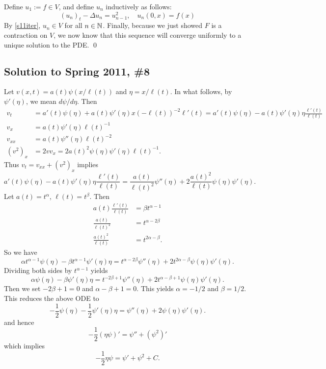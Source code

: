 \vspace{0.2cm}

Define $u_1 := f \in V$, and define $u_n$ inductively as follows:
$$ (u_n)_t - \Delta u_n = u_{n-1}^2, \quad u_n(0,x) = f(x) $$
By \eqref{s11iter}, $u_n \in V$ for all $n \in \mathbb{N}$. Finally, because we just showed $F$ is a contraction on $V$, we now know that this sequence will converge uniformly to a unique solution to the PDE.
\hfill\qed


\subsection*{Solution to Spring 2011, \#8}\label{s118}
Let $v(x, t) = a(t)\psi(x/\ell(t))$ and $\eta = x/\ell(t)$. In what follows, by $\psi'(\eta)$, we mean $d\psi/d\eta$.
Then
\begin{align*}
v_{t} &= a'(t)\psi(\eta) + a(t)\psi'(\eta)x(-\ell(t))^{-2}\ell'(t) = a'(t)\psi(\eta) - a(t)\psi'(\eta)\eta\frac{\ell'(t)}{\ell(t)}\\
v_{x} &= a(t)\psi'(\eta)\ell(t)^{-1}\\
v_{xx} &= a(t)\psi''(\eta)\ell(t)^{-2}\\
(v^{2})_{x} &= 2vv_{x} = 2a(t)^{2}\psi(\eta)\psi'(\eta)\ell(t)^{-1}.
\end{align*}
Thus $v_{t} = v_{xx} + (v^{2})_{x}$ implies
$$a'(t)\psi(\eta) - a(t)\psi'(\eta)\eta\frac{\ell'(t)}{\ell(t)} = \frac{a(t)}{\ell(t)^{2}}\psi''(\eta) + 2\frac{a(t)^{2}}{\ell(t)}\psi(\eta)\psi'(\eta).$$
Let $a(t) = t^{\alpha}$, $\ell(t) = t^{\beta}$. Then
\begin{align*}
a(t)\frac{\ell'(t)}{\ell(t)} &= \beta t^{\alpha - 1}\\
\frac{a(t)}{\ell(t)^{2}} &= t^{\alpha - 2\beta}\\
\frac{a(t)^{2}}{\ell(t)} &= t^{2\alpha - \beta}.
\end{align*}
So we have
$$\alpha t^{\alpha - 1}\psi(\eta) - \beta t^{\alpha - 1}\psi'(\eta)\eta = t^{\alpha - 2\beta}\psi''(\eta) + 2t^{2\alpha - \beta}\psi(\eta)\psi'(\eta).$$
Dividing both sides by $t^{\alpha - 1}$ yields
$$\alpha\psi(\eta) - \beta \psi'(\eta)\eta = t^{-2\beta + 1}\psi''(\eta) + 2t^{\alpha - \beta + 1}\psi(\eta)\psi'(\eta).$$
Then we set $-2\beta + 1 = 0$ and $\alpha - \beta + 1 = 0$. This yields $\alpha = -1/2$ and $\beta = 1/2$.
This reduces the above ODE to
$$-\frac{1}{2}\psi(\eta) - \frac{1}{2}\psi'(\eta)\eta = \psi''(\eta) + 2\psi(\eta)\psi'(\eta).$$
and hence
$$-\frac{1}{2}(\eta\psi)' = \psi'' + (\psi^{2})'$$
which implies
$$-\frac{1}{2}\eta\psi = \psi' + \psi^{2} + C.$$
